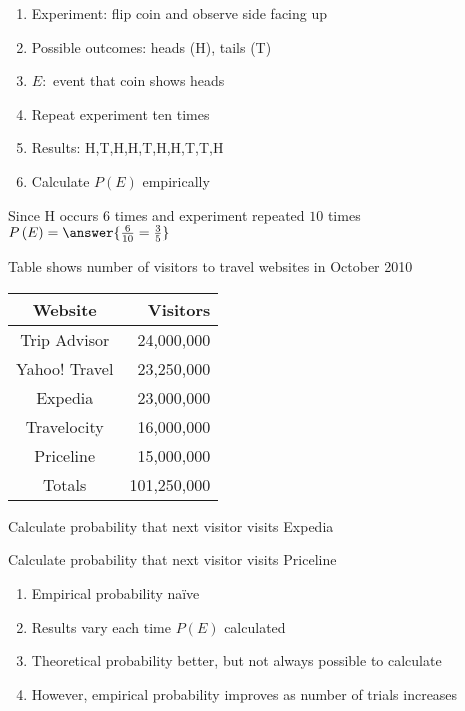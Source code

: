 \documentclass{ximera}
\begin{document}
\begin{question}
\begin{enumerate}
\item Experiment: flip coin and observe side facing up
\item Possible outcomes: heads (H), tails (T)
\item $E:$ event that coin shows heads
\item Repeat experiment ten times
\item Results: H,T,H,H,T,H,H,T,T,H
\item Calculate $P\left(E\right)$ empirically
\end{enumerate}
\begin{solution} Since H occurs $6$ times
and experiment repeated $10$ times
$P\left(E\right)=\answer{\frac{6}{10}=\frac{3}{5}}$
\end{solution}
\end{question}

\begin{question}
Table shows number of visitors to travel websites in October 2010
\begin{center}\begin{tabular}{cr}
Website&Visitors\\\toprule
Trip Advisor&24,000,000\\
Yahoo! Travel&23,250,000\\
Expedia&23,000,000\\
Travelocity&16,000,000\\
Priceline&15,000,000\\\midrule
Totals&101,250,000
\end{tabular}\end{center}
\begin{parts}
\item Calculate probability that next visitor
visits Expedia
\begin{solution}\end{solution}
\item Calculate probability that next visitor
visits Priceline 
\begin{solution}\end{solution}
\end{parts}
\end{question}

\begin{remark}
\begin{enumerate}
\item Empirical probability na\"ive
\item Results vary each time $P\left(E\right)$ calculated
\item Theoretical probability better, but not always possible to calculate
\item However, empirical probability improves
as number of trials increases
\end{enumerate}
\end{remark}
\end{document}
